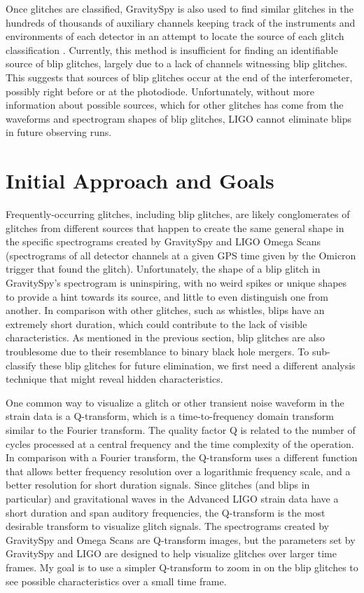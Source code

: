 \documentclass[a4paper]{article}
\begin{document}
Once glitches are classified, GravitySpy is also used to find similar glitches in the hundreds of thousands of auxiliary channels keeping track of the instruments and environments of each detector in an attempt to locate the source of each glitch classification \cite{Zevin:2016}. Currently, this method is insufficient for finding an identifiable source of blip glitches, largely due to a lack of channels witnessing blip glitches. This suggests that sources of blip glitches occur at the end of the interferometer, possibly right before or at the photodiode. Unfortunately, without more information about possible sources, which for other glitches has come from the waveforms and spectrogram shapes of blip glitches, LIGO cannot eliminate blips in future observing runs. 

\section{Initial Approach and Goals} \label{goal}

Frequently-occurring glitches, including blip glitches, are likely conglomerates of glitches from different sources that happen to create the same general shape in the specific spectrograms created by GravitySpy and LIGO Omega Scans (spectrograms of all detector channels at a given GPS time given by the Omicron trigger that found the glitch). Unfortunately, the shape of a blip glitch in GravitySpy's spectrogram is uninspiring, with no weird spikes or unique shapes to provide a hint towards its source, and little to even distinguish one from another. In comparison with other glitches, such as whistles, blips have an extremely short duration, which could contribute to the lack of visible characteristics. As mentioned in the previous section, blip glitches are also troublesome due to their resemblance to binary black hole mergers. To sub-classify these blip glitches for future elimination, we first need a different analysis technique that might reveal hidden characteristics. 

One common way to visualize a glitch or other transient noise waveform in the strain data is a Q-transform, which is a time-to-frequency domain transform similar to the Fourier transform. The quality factor Q is related to the number of cycles processed at a central frequency and the time complexity of the operation. In comparison with a Fourier transform, the Q-transform uses a different function that allows better frequency resolution over a logarithmic frequency scale, and a better resolution for short duration signals. Since glitches (and blips in particular) and gravitational waves in the Advanced LIGO strain data have a short duration and span auditory frequencies, the Q-transform is the most desirable transform to visualize glitch signals. The spectrograms created by GravitySpy and Omega Scans are Q-transform images, but the parameters set by GravitySpy and LIGO are designed to help visualize glitches over larger time frames. My goal is to use a simpler Q-transform to zoom in on the blip glitches to see possible characteristics over a small time frame.
\end{document}
